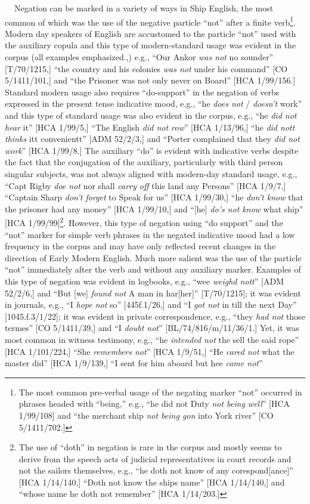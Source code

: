 \begin{styleStandard}
\textbf{\ \ }Negation can be marked in a variety of ways in Ship English, the most common of which was the use of the negative particle “not” after a finite verb\footnote{ The most common pre-verbal usage of the negating marker “not” occurred in phrases headed with “being,” e.g., “he did not Duty \textit{not being well}” [HCA 1/99/108] and “the merchant ship \textit{not being gon} into York river” [CO 5/1411/702.] }. Modern day speakers of English are accustomed to the particle “not” used with the auxiliary copula and this type of modern-standard usage was evident in the corpus (all examples emphasized.,) e.g., “Our Ankor \textit{was not} no sounder” [T/70/1215,] “the country and his colonies \textit{was not} under his command” [CO 5/1411/101,] and “the Prisoner was not only never on Board” [HCA 1/99/156.] Standard modern usage also requires “do-support” in the negation of verbs expressed in the present tense indicative mood, e.g., “he \textit{does not} / \textit{doesn’t }work” and this type of standard usage was also evident in the corpus, e.g., “he \textit{did not hear} it” [HCA 1/99/5,] “The English \textit{did not row}” [HCA 1/13/96,] “he \textit{did nott} \textit{thinks} itt convenientt” [ADM 52/2/3,] and “Porter complained that they \textit{did not work}” [HCA 1/99/8.] The auxiliary “do” is evident with indicative verbs despite the fact that the conjugation of the auxiliary, particularly with third person singular subjects, was not always aligned with modern-day standard usage, e.g., “Capt Rigby \textit{doe not} nor shall \textit{carry off} this land any Persons” [HCA 1/9/7,] “Captain Sharp \textit{don’t forget} to Speak for us” [HCA 1/99/30,] “he \textit{don’t know} that the prisoner had any money” [HCA 1/99/10,] and “[he] \textit{do’s not know} what ship” [HCA 1/99/99]\footnote{ The use of “doth” in negation is rare in the corpus and mostly seems to derive from the speech acts of judicial representatives in court records and not the sailors themselves, e.g., “he doth not know of any corespond[ance]” [HCA 1/14/140,] “Doth not know the ships name” [HCA 1/14/140,] and “whose name he doth not remember” [HCA 1/14/203.] }. However, this type of negation using “do support” and the “not” marker for simple verb phrases in the negated indicative mood had a low frequency in the corpus and may have only reflected recent changes in the direction of Early Modern English. Much more salient was the use of the particle “not” immediately after the verb and without any auxiliary marker. Examples of this type of negation was evident in logbooks, e.g., “wee \textit{weighd nott}” [ADM 52/2/6,] and “But [we] \textit{found not} A man in har[her]” [T/70/1215]; it was evident in journals, e.g., “I \textit{hope not} so” [445f.1/26,] and “I \textit{got not} in till the next Day” [1045.f.3/1/22]; it was evident in private correspondence, e.g., “they \textit{had not} those termes” [CO 5/1411/39,] and “I \textit{doubt not}” [BL/74/816/m/11/36/1.] Yet, it was most common in witness testimony, e.g., “he \textit{intended not} the sell the said rope” [HCA 1/101/224,] “She \textit{remembers not}” [HCA 1/9/51,] “He \textit{cared not} what the master did” [HCA 1/9/139,] “I sent for him aboard but hee \textit{came not}” 
\end{styleStandard}
